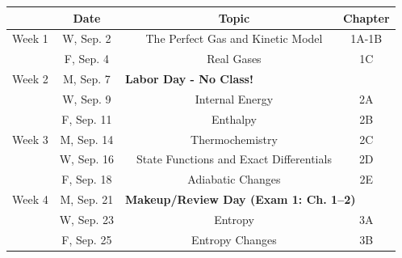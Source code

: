 \begin{tabular}{rcccc}
	            & Date       &                                                                                             & Topic                                        & Chapter \\
	\midrule
	Week 1      & W, Sep. 2  &                                                                                             & The Perfect Gas and Kinetic Model            & 1A-1B   \\
	            & F, Sep. 4  &                                                                                             & Real Gases                                   & 1C      \\
	\midrule
	Week 2      & M, Sep. 7  & \multicolumn{3}{l}{\textbf{Labor Day - No Class!}}                                                                                                   \\
	            & W, Sep. 9  &                                                                                             & Internal Energy                              & 2A      \\
	            & F, Sep. 11 &                                                                                             & Enthalpy                                     & 2B      \\
	\midrule
	Week 3      & M, Sep. 14 &                                                                                             & Thermochemistry                              & 2C      \\
	            & W, Sep. 16 &                                                                                             & State Functions and Exact Differentials      & 2D      \\
	            & F, Sep. 18 &                                                                                             & Adiabatic Changes                            & 2E      \\
	\midrule
	Week 4      & M, Sep. 21 & \multicolumn{3}{l}{\textbf{Makeup/Review Day (Exam 1: Ch. 1--2)}}                                                                                    \\
	            & W, Sep. 23 &                                                                                             & Entropy                                      & 3A      \\
	            & F, Sep. 25 &                                                                                             & Entropy Changes                              & 3B      \\

\end{tabular}
